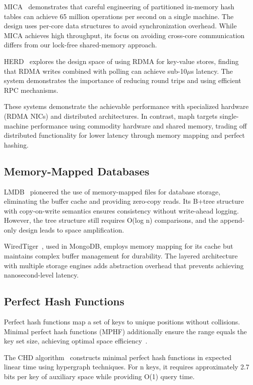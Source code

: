 \documentclass[10pt,conference]{IEEEtran}
\begin{document}
MICA~\cite{mica} demonstrates that careful engineering of partitioned in-memory hash tables can achieve 65 million operations per second on a single machine. The design uses per-core data structures to avoid synchronization overhead. While MICA achieves high throughput, its focus on avoiding cross-core communication differs from our lock-free shared-memory approach.

HERD~\cite{herd} explores the design space of using RDMA for key-value stores, finding that RDMA writes combined with polling can achieve sub-10$\mu$s latency. The system demonstrates the importance of reducing round trips and using efficient RPC mechanisms.

These systems demonstrate the achievable performance with specialized hardware (RDMA NICs) and distributed architectures. In contrast, maph targets single-machine performance using commodity hardware and shared memory, trading off distributed functionality for lower latency through memory mapping and perfect hashing.

\subsection{Memory-Mapped Databases}

LMDB~\cite{lmdb} pioneered the use of memory-mapped files for database storage, eliminating the buffer cache and providing zero-copy reads. Its B+tree structure with copy-on-write semantics ensures consistency without write-ahead logging. However, the tree structure still requires O(log n) comparisons, and the append-only design leads to space amplification.

WiredTiger~\cite{wiredtiger}, used in MongoDB, employs memory mapping for its cache but maintains complex buffer management for durability. The layered architecture with multiple storage engines adds abstraction overhead that prevents achieving nanosecond-level latency.

\subsection{Perfect Hash Functions}

Perfect hash functions map a set of keys to unique positions without collisions. Minimal perfect hash functions (MPHF) additionally ensure the range equals the key set size, achieving optimal space efficiency~\cite{mphf-survey}.

The CHD algorithm~\cite{chd-algorithm} constructs minimal perfect hash functions in expected linear time using hypergraph techniques. For n keys, it requires approximately 2.7 bits per key of auxiliary space while providing O(1) query time.
\end{document}
